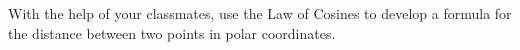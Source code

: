 { With the help of your classmates, use the Law of Cosines to develop a formula for the distance between two points in polar coordinates.}
{}
